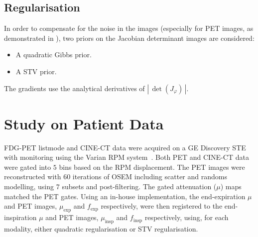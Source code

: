 \documentclass[portrait,color=UCLrichred,margin=3cm]{uclposter}
\begin{document}
\begin{multicols}{4}
\subsection*{Regularisation}

In order to compensate for the noise in the images (especially for PET images, as demonstrated in \cite{Thielemans2009}), two priors on the Jacobian determinant images are considered:
\begin{itemize}
    \item A quadratic Gibbs prior.%
    \item A \gls{STV} prior.%
\end{itemize}

The gradients use the analytical derivatives of $\left|\, \det(J_\varphi)\,\right|$.

\section*{Study on Patient Data}


FDG-PET listmode and CINE-CT data were acquired on a GE Discovery STE with monitoring using the Varian RPM system~\cite{Cuplov2018}. Both PET and CINE-CT data were gated into $5$ bins based on the RPM displacement. The PET images were reconstructed with $60$ iterations of OSEM including scatter and randoms modelling, using $7$ subsets and post-filtering. The gated attenuation ($\mu$) maps matched the PET gates.
Using an in-house implementation, the end-expiration $\mu$ and PET images, $\mu_\mathrm{exp}$ and $f_\mathrm{exp}$ respectively, were then registered to the end-inspiration $\mu$ and PET images, $\mu_\mathrm{insp}$ and $f_\mathrm{insp}$ respectively, using, for each modality, either quadratic regularisation or \gls{STV} regularisation.


\end{multicols}
\end{document}
